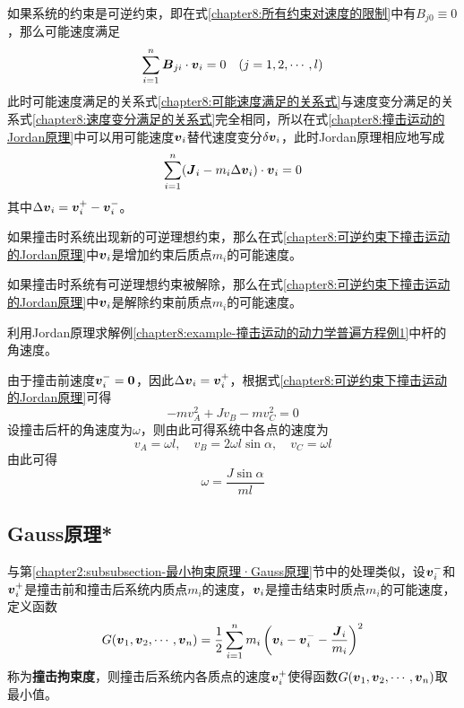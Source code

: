如果系统的约束是可逆约束，即在式\eqref{chapter8:所有约束对速度的限制}中有$B_{j0}\equiv 0$，那么可能速度满足
\begin{equation}
	\sum_{i=1}^n \boldsymbol{B}_{ji}\cdot \boldsymbol{v}_i = 0\quad (j=1,2,\cdots,l)
	\label{chapter8:可能速度满足的关系式}
\end{equation}
此时可能速度满足的关系式\eqref{chapter8:可能速度满足的关系式}与速度变分满足的关系式\eqref{chapter8:速度变分满足的关系式}完全相同，所以在式\eqref{chapter8:撞击运动的Jordan原理}中可以用可能速度$\boldsymbol{v}_i$替代速度变分$\delta\boldsymbol{v}_i$，此时Jordan原理相应地写成
\begin{equation}
	\sum_{i=1}^n (\boldsymbol{J}_i-m_i\Delta\boldsymbol{v}_i) \cdot \boldsymbol{v}_i = 0
	\label{chapter8:可逆约束下撞击运动的Jordan原理}
\end{equation}
其中$\Delta\boldsymbol{v}_i = \boldsymbol{v}_i^+-\boldsymbol{v}_i^-$。

如果撞击时系统出现新的可逆理想约束，那么在式\eqref{chapter8:可逆约束下撞击运动的Jordan原理}中$\boldsymbol{v}_i$是增加约束后质点$m_i$的可能速度。

如果撞击时系统有可逆理想约束被解除，那么在式\eqref{chapter8:可逆约束下撞击运动的Jordan原理}中$\boldsymbol{v}_i$是解除约束前质点$m_i$的可能速度。

\begin{example}
利用Jordan原理求解例\ref{chapter8:example-撞击运动的动力学普遍方程例1}中杆的角速度。
\end{example}
\begin{solution}
由于撞击前速度$\boldsymbol{v}_i^-=\boldsymbol{0}$，因此$\Delta\boldsymbol{v}_i=\boldsymbol{v}_i^+$，根据式\eqref{chapter8:可逆约束下撞击运动的Jordan原理}可得
\begin{equation*}
	-mv_A^2 + Jv_B - mv_C^2 = 0
\end{equation*}
设撞击后杆的角速度为$\omega$，则由此可得系统中各点的速度为
\begin{equation*}
	v_A = \omega l,\quad v_B = 2\omega l\sin\alpha, \quad v_C = \omega l
\end{equation*}
由此可得
\begin{equation*}
	\omega = \frac{J\sin\alpha}{ml}
\end{equation*}
\end{solution}

\subsection{Gauss原理*}

与第\ref{chapter2:subsubsection-最小拘束原理·Gauss原理}节中的处理类似，设$\boldsymbol{v}_i^-$和$\boldsymbol{v}_i^+$是撞击前和撞击后系统内质点$m_i$的速度，$\boldsymbol{v}_i$是撞击结束时质点$m_i$的可能速度，定义函数
\begin{equation}
	G(\boldsymbol{v}_1,\boldsymbol{v}_2,\cdots,\boldsymbol{v}_n) = \frac12 \sum_{i=1}^n m_i\left(\boldsymbol{v}_i-\boldsymbol{v}_i^- - \frac{\boldsymbol{J}_i}{m_i}\right)^2
	\label{chapter8:撞击拘束度的定义式}
\end{equation}
称为{\bf 撞击拘束度}，则撞击后系统内各质点的速度$\boldsymbol{v}_i^+$使得函数$G(\boldsymbol{v}_1,\boldsymbol{v}_2,\cdots,\boldsymbol{v}_n)$取最小值。


